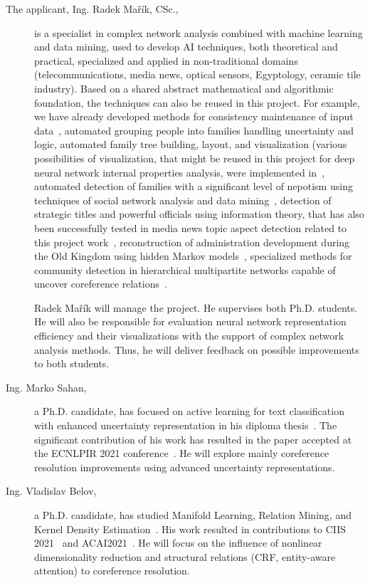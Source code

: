 \begin{description}
	\item [The applicant, Ing. Radek Mařík, CSc.,]  is a specialist in complex network analysis combined with machine learning and data mining, used to develop AI techniques, both theoretical and practical, specialized and applied in non-traditional domains (telecommunications, media news, optical sensors, Egyptology, ceramic tile industry). Based on a shared abstract mathematical and algorithmic foundation, the techniques can also be reused in this project. For example, we have already developed methods for consistency maintenance of input data~\cite{Marik2016c}, automated grouping people into families handling uncertainty and logic, automated family tree building, layout, and visualization (various possibilities of visualization, that might be reused in this project for deep neural network internal properties analysis, were implemented in~\cite{Marik2016,Marik2016b,Marik2017d,Marik2017,Marik2018a,Marik2019a}, automated detection of families with a significant level of nepotism using techniques of social network analysis and data mining~\cite{Dulikova2015,Dulikova2017b}, detection of strategic titles and powerful officials using information theory, that has also been successfully tested in media news topic aspect detection related to this project work~\cite{Marik2018c}, reconstruction of administration development during the Old Kingdom using hidden Markov models~\cite{Dulikova2017b,Marik2017e}, specialized methods for community detection in hierarchical multipartite networks capable of uncover coreference relations~\cite{Marik2018d,Belov2020,Zikmund2020}. 
	
Radek Mařík will manage the project. He supervises both Ph.D. students. He will also be responsible for evaluation neural network representation efficiency and their visualizations with the support of complex network analysis methods. Thus, he will deliver feedback on possible improvements to both students.

\item [Ing. Marko Sahan,] a Ph.D. candidate, has focused on active learning for text classification with enhanced uncertainty representation in his diploma thesis~\cite{Sahan2020}. The significant contribution of his work has resulted in the paper accepted at the ECNLPIR 2021 conference~\cite{Sahan2021}. He will explore mainly coreference resolution improvements using advanced uncertainty representations.

\item [Ing. Vladislav Belov,] a Ph.D. candidate, has studied Manifold Learning, Relation Mining, and Kernel Density Estimation~\cite{Belov2020}. His work resulted in contributions to CIIS 2021~\cite{Belov2021ML} and ACAI2021~\cite{Belov2021KDE}. He will focus on the influence of nonlinear dimensionality reduction and structural relations (CRF, entity-aware attention) to coreference resolution.

\end{description}

